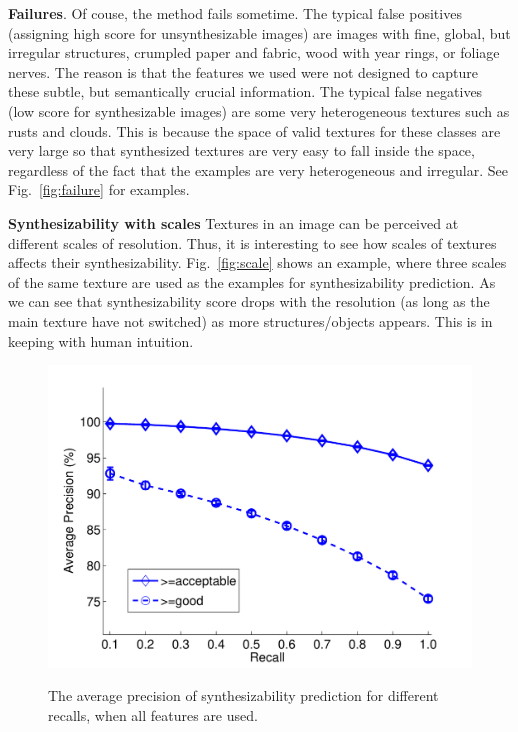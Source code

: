 \documentclass[10pt,twocolumn,letterpaper]{article}
\begin{document}
\textbf{Failures}. Of couse, the method fails sometime. The typical
false positives (assigning high score for unsynthesizable images) are
images with fine, global, but irregular structures, \eg crumpled paper
and fabric, wood with year rings, or foliage nerves. The reason is
that the features we used were not designed to capture these subtle,
but semantically crucial information. The typical false negatives (low
score for synthesizable images) are some very heterogeneous textures
such as rusts and clouds. This is because the space of valid textures
for these classes are very large so that synthesized textures are very
easy to fall inside the space, regardless of the fact that the examples
are very heterogeneous and irregular. See Fig.~\ref{fig:failure} for
examples. 

\textbf{Synthesizability with scales} Textures in an image can be
perceived at different scales of resolution. Thus, it is interesting
to see how scales of textures affects their
synthesizability. Fig.~\ref{fig:scale} shows an example, where three
scales of the same texture are used as the examples for
synthesizability prediction. As we can see that synthesizability score
drops with the resolution (as long as the main texture have not
switched) as more structures/objects appears. This is in keeping with
human intuition.



\begin{figure} 
 \centering
\includegraphics[width=0.8\linewidth]{./figs/AP_curve_all.pdf} \\ 
\caption{The average precision of synthesizability prediction for different recalls, when all features are used. }
  \label{fig:curve}
\end{figure}
\end{document}
